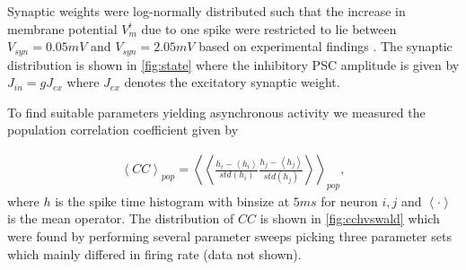 \documentclass[11pt]{article}
\newcommand{\mean}[1]{\left<{#1}\right>}
\begin{document}
Synaptic weights were log-normally distributed such that the increase in membrane potential $ V_m^i $ due to one spike were restricted to lie between $ V_{syn} = 0.05 mV $ and $ V_{syn} = 2.05 mV $ based on experimental findings \citep{Sayer1990,Mason1991}. The synaptic distribution is shown in \cref{fig:state} where the inhibitory PSC amplitude is given by $ J_{in} = g J_{ex} $ where $ J_{ex} $ denotes the excitatory synaptic weight.

To find suitable parameters yielding asynchronous activity we measured the population correlation coefficient given by

\begin{align}
\mean{CC}_{pop} = \mean{\mean{\frac{h_{i} - \mean{h_{i}}}{std(h_{i})}\frac{h_{j} - \mean{h_{j}}}{std(h_{j})}}}_{pop},
\end{align}
where $ h $ is the spike time histogram with binsize at $ 5ms $ for neuron $ i,j $ and $ \mean{\cdot} $ is the mean operator. The distribution of $ CC $ is shown in \cref{fig:cchvswald} which were found by performing several parameter sweeps picking three parameter sets which mainly differed in firing rate (data not shown). 
\end{document}
